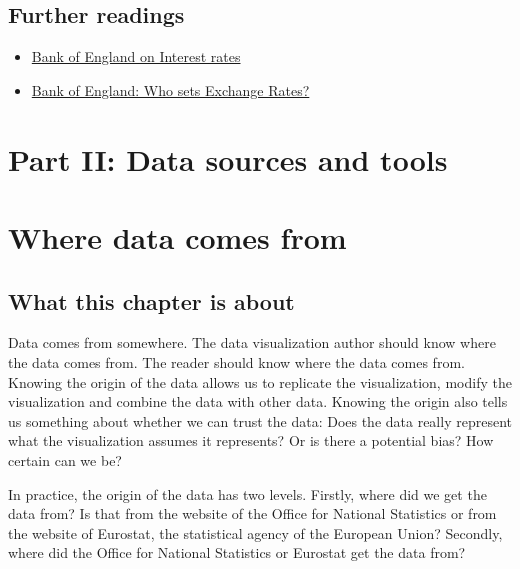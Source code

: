 \documentclass[
]{book}
\providecommand{\tightlist}{%
  \setlength{\itemsep}{0pt}\setlength{\parskip}{0pt}}
\begin{document}
\hypertarget{further-readings-7}{%
\section{Further readings}\label{further-readings-7}}

\begin{itemize}
\tightlist
\item
  \href{https://www.bankofengland.co.uk/knowledgebank/what-are-interest-rates}{Bank of England on Interest rates}
\item
  \href{https://www.bankofengland.co.uk/knowledgebank/who-sets-exchange-rates}{Bank of England: Who sets Exchange Rates?}
\end{itemize}

\hypertarget{part-ii-data-sources-and-tools}{%
\chapter*{Part II: Data sources and tools}\label{part-ii-data-sources-and-tools}}

\hypertarget{where-data-comes-from}{%
\chapter{Where data comes from}\label{where-data-comes-from}}

\hypertarget{what-this-chapter-is-about-6}{%
\section{What this chapter is about}\label{what-this-chapter-is-about-6}}

Data comes from somewhere. The data visualization author should know where the data comes from. The reader should know where the data comes from. Knowing the origin of the data allows us to replicate the visualization, modify the visualization and combine the data with other data. Knowing the origin also tells us something about whether we can trust the data: Does the data really represent what the visualization assumes it represents? Or is there a potential bias? How certain can we be?

In practice, the origin of the data has two levels. Firstly, where did we get the data from? Is that from the website of the Office for National Statistics or from the website of Eurostat, the statistical agency of the European Union? Secondly, where did the Office for National Statistics or Eurostat get the data from?
\end{document}
